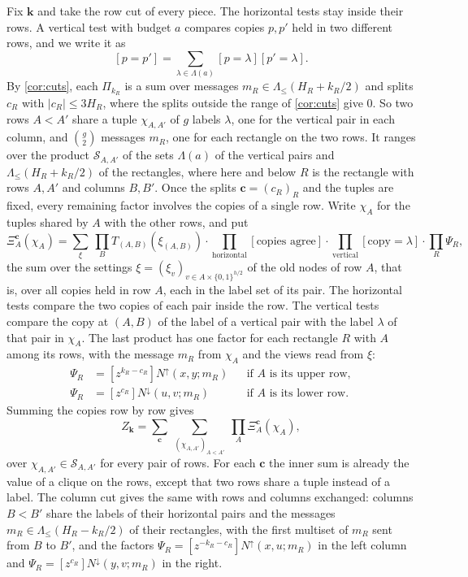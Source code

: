 \documentclass[11pt]{article}
\theoremstyle{definition}
\theoremstyle{definition}
\theoremstyle{remark}
\newcommand{\Nup}{N^{\uparrow}}
\newcommand{\Ndown}{N^{\downarrow}}
\begin{document}
Fix $\mathbf k$ and take the row cut of every piece. The horizontal tests stay inside their rows. A vertical test with budget $a$ compares copies $p,p'$ held in two different rows, and we write it as
\[
[p=p']=\sum_{\lambda\in\Lambda(a)}[p=\lambda][p'=\lambda].
\]
By \cref{cor:cuts}, each $\Pi_{k_R}$ is a sum over messages $m_R\in\Lambda_{\le}(H_R+k_R/2)$ and splits $c_R$ with $|c_R|\le3H_R$, where the splits outside the range of \cref{cor:cuts} give $0$. So two rows $A<A'$ share a tuple $\chi_{A,A'}$ of $g$ labels $\lambda$, one for the vertical pair in each column, and $\binom g2$ messages $m_R$, one for each rectangle on the two rows. It ranges over the product $\mathcal S_{A,A'}$ of the sets $\Lambda(a)$ of the vertical pairs and $\Lambda_{\le}(H_R+k_R/2)$ of the rectangles, where here and below $R$ is the rectangle with rows $A,A'$ and columns $B,B'$. Once the splits $\mathbf c=(c_R)_R$ and the tuples are fixed, every remaining factor involves the copies of a single row. Write $\chi_A$ for the tuples shared by $A$ with the other rows, and put
\begin{equation}\label{eq:table}
\Xi^{\mathbf c}_A(\chi_A)=\sum_\xi\ \prod_BT_{(A,B)}(\xi_{(A,B)})\cdot\prod_{\text{horizontal}}[\text{copies agree}]\cdot\prod_{\text{vertical}}[\text{copy}=\lambda]\cdot\prod_R\Psi_R,
\end{equation}
the sum over the settings $\xi=(\xi_v)_{v\in A\times\{0,1\}^{h/2}}$ of the old nodes of row $A$, that is, over all copies held in row $A$, each in the label set of its pair. The horizontal tests compare the two copies of each pair inside the row. The vertical tests compare the copy at $(A,B)$ of the label of a vertical pair with the label $\lambda$ of that pair in $\chi_A$. The last product has one factor for each rectangle $R$ with $A$ among its rows, with the message $m_R$ from $\chi_A$ and the views read from $\xi$:
\begin{align*}
\Psi_R&=[z^{k_R-c_R}]\Nup(x,y;m_R) &&\text{if $A$ is its upper row},\\
\Psi_R&=[z^{c_R}]\Ndown(u,v;m_R) &&\text{if $A$ is its lower row}.
\end{align*}
Summing the copies row by row gives
\begin{equation}\label{eq:rowsum}
Z_{\mathbf k}=\sum_{\mathbf c}\ \sum_{(\chi_{A,A'})_{A<A'}}\ \prod_A\Xi^{\mathbf c}_A(\chi_A),
\end{equation}
over $\chi_{A,A'}\in \mathcal S_{A,A'}$ for every pair of rows. For each $\mathbf c$ the inner sum is already the value of a clique on the rows, except that two rows share a tuple instead of a label. The column cut gives the same with rows and columns exchanged: columns $B<B'$ share the labels of their horizontal pairs and the messages $m_R\in\Lambda_{\le}(H_R-k_R/2)$ of their rectangles, with the first multiset of $m_R$ sent from $B$ to $B'$, and the factors $\Psi_R=[z^{-k_R-c_R}]\Nup(x,u;m_R)$ in the left column and $\Psi_R=[z^{c_R}]\Ndown(y,v;m_R)$ in the right.
\end{document}
